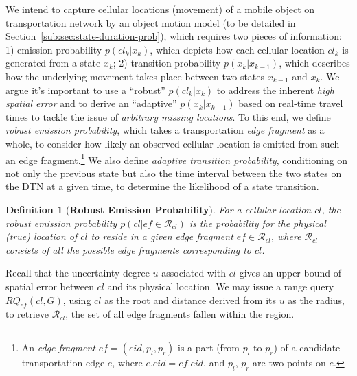 \documentclass{vldb}
\newtheorem{definition}{Definition}
\begin{document}
	We intend to capture cellular locations (movement) of a mobile object on transportation network by an object motion model (to be detailed in Section~\ref{sub:sec:state-duration-prob}), which requires two pieces of information:
	1) emission probability $p(cl_k|x_k)$, which depicts how each cellular location $cl_k$ is generated from a state $x_k$; 2) transition probability $p(x_k|x_{k-1})$, which describes how the underlying movement takes place between two states $x_{k-1}$ and $x_{k}$.
	We argue it's important to use a ``robust'' $p(cl_k|x_k)$ to address the inherent {\em high spatial error} and to derive an ``adaptive'' $p(x_k|x_{k-1})$ based on real-time travel times to tackle the issue of {\em arbitrary missing locations}. To this end, we define {\em robust emission probability}, which takes a transportation {\em edge fragment} as a whole, to consider how likely an observed cellular location is emitted from such an edge fragment.\footnote{An {\em edge fragment} $ef=(eid,p_l,p_r)$ is a part (from $p_l$ to $p_r$) of a candidate transportation edge $e$, where $e.eid=ef.eid$, and $p_l$, $p_r$ are two points on $e$.}
	We also define  {\em adaptive transition probability}, conditioning on not only the previous state but also the time interval between the two states on the DTN at a given time, to determine the likelihood of a state transition.
	
	\begin{definition}[\textbf{Robust Emission Probability}]
		For a cellular location $cl$, the robust emission probability $p(cl|ef\in \mathcal{R}_{cl})$ is the probability for the physical (true) location of $cl$ to reside in a given edge fragment $ef\in\mathcal{R}_{cl}$, where $\mathcal{R}_{cl}$ consists of all the possible edge fragments corresponding to $cl$.
	\end{definition}
	
	Recall that the uncertainty degree $u$ associated with $cl$ gives an upper bound of spatial error between $cl$ and its physical location. We may issue a range query $RQ_{ef}(cl,G)$, using $cl$ as the root and distance derived from its $u$ as the radius, to retrieve $\mathcal{R}_{cl}$, the set of all edge fragments 
	fallen within the region. %
	
\end{document}
